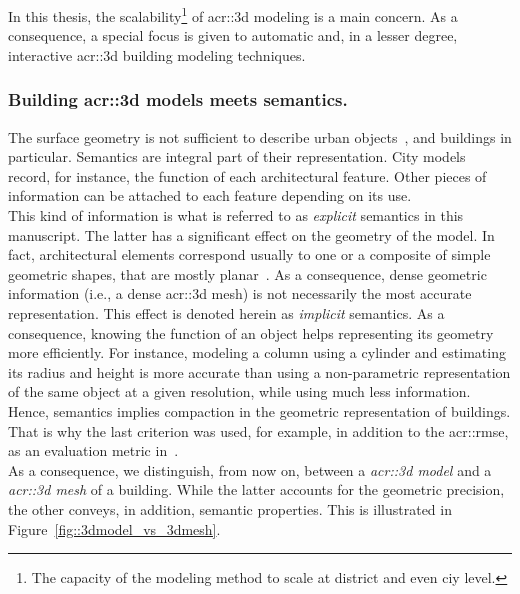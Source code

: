             In this thesis, the scalability\footnote{The capacity of the modeling method to scale at district and even ciy level.} of \gls{acr::3d} modeling is a main concern.
            As a consequence, a special focus is given to automatic and, in a lesser degree, interactive \gls{acr::3d} building modeling techniques.

        \subsubsection{Building \texorpdfstring{\gls*{acr::3d}}{3D} models meets semantics.}
            \label{subsubsec::introduction::urban_3d_reconstruction::building_3d_modeling::semantics}
            The surface geometry is not sufficient to describe urban objects~\parencite{biljecki2016improved}, and buildings in particular.
            Semantics are integral part of their representation.
            City models record, for instance, the function of each architectural feature.
            Other pieces of information can be attached to each feature depending on its use.\\
            This kind of information is what is referred to as \textit{explicit} semantics in this manuscript.
            The latter has a significant effect on the geometry of the model.
            In fact, architectural elements correspond usually to one or a composite of simple geometric shapes, that are mostly planar~\parencite{kolbe2005citygml}.
            As a consequence, dense geometric information (i.e., a dense \gls{acr::3d} mesh) is not necessarily the most accurate representation.
            This effect is denoted herein as \textit{implicit} semantics.
            As a consequence, knowing the function of an object helps representing its geometry more efficiently.
            For instance, modeling a column using a cylinder and estimating its radius and height is more accurate than using a non-parametric representation of the same object at a given resolution, while using much less information.
            Hence, semantics implies compaction in the geometric representation of buildings.
            That is why the last criterion was used, for example, in addition to the \gls{acr::rmse}, as an evaluation metric in~\parencite{lafarge2012creating}.\\
            As a consequence, we distinguish, from now on, between a \textit{\gls{acr::3d} model} and a \textit{\gls{acr::3d} mesh} of a building.
            While the latter accounts for the geometric precision, the other conveys, in addition, semantic properties.
            This is illustrated in Figure~\ref{fig::3dmodel_vs_3dmesh}.\\

